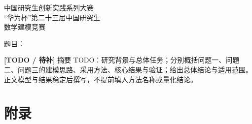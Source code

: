 \documentclass[12pt, a4paper]{ctexart}
\newcommand{\pending}[1]{\par\noindent\textcolor{red!65!black}{\textbf{[TODO / 待补]} #1}\par}
\begin{document}
% 

\setcounter{page}{1}
\vspace*{0.3cm}   %
\begin{center}
  { 中国研究生创新实践系列大赛}\\[10pt]
  { “华为杯”第二十三届中国研究生}\\[10pt]
  { 数学建模竞赛}
\end{center}

\vspace{1.8em}
\begin{center}
  { 题\quad 目：}\underline{}
\end{center}

\vspace{1.8em}
\par
\vspace{2pt}
\pending{摘要 TODO：研究背景与总体任务；分别概括问题一、问题二、问题三的建模思路、采用方法、核心结果与验证；给出总体结论与适用范围。正文模型与结果稳定后撰写，不提前填入方法名称或量化结论。}

\vspace{1.2em}

\newpage
\tableofcontents

\newpage









\appendix
\section*{附录}




\end{document}
